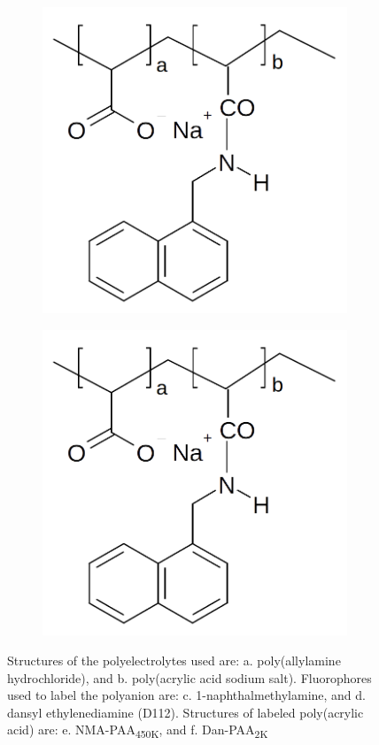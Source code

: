 \documentclass[journal=mamobx,manuscript=article]{achemso}
\begin{document}
\begin{figure}[H]
\begin{subfigure}[b]{0.35\textwidth}
        \includegraphics[scale=0.85]{fig1E.png}
        \caption{}
        \label{fig:E}
    \end{subfigure}
    \begin{subfigure}[b]{0.35\textwidth}
        \includegraphics[scale=0.85]{fig1E.png}
        \caption{}
        \label{fig:f}
    \end{subfigure}
    \caption{Structures of the polyelectrolytes used are: a. poly(allylamine hydrochloride), and b. poly(acrylic acid sodium salt).  Fluorophores used to label the polyanion are: c. 1-naphthalmethylamine, and d. dansyl ethylenediamine (D112).  Structures of labeled poly(acrylic acid) are: e. NMA-PAA\textsubscript{450K}, and f. Dan-PAA\textsubscript{2K} }
    \label{figure 1}
\end{figure}
\end{document}
